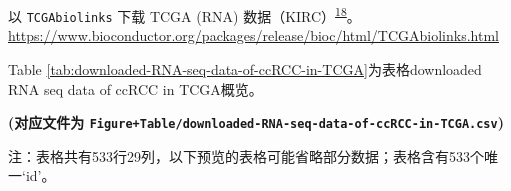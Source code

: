 \documentclass[
]{article}
\begin{document}
以 \texttt{TCGAbiolinks} 下载 TCGA (RNA) 数据（KIRC）\textsuperscript{\protect\hyperlink{ref-TcgabiolinksAColapr2015}{18}}。
\url{https://www.bioconductor.org/packages/release/bioc/html/TCGAbiolinks.html}

Table \ref{tab:downloaded-RNA-seq-data-of-ccRCC-in-TCGA}为表格downloaded RNA seq data of ccRCC in TCGA概览。

\textbf{(对应文件为 \texttt{Figure+Table/downloaded-RNA-seq-data-of-ccRCC-in-TCGA.csv})}

\begin{center}\begin{tcolorbox}[colback=gray!10, colframe=gray!50, width=0.9\linewidth, arc=1mm, boxrule=0.5pt]注：表格共有533行29列，以下预览的表格可能省略部分数据；表格含有533个唯一`id'。
\end{tcolorbox}
\end{center}
\end{document}
